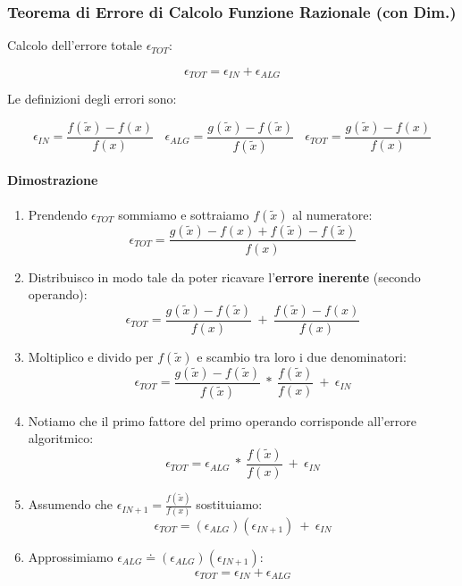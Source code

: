 \documentclass{article}
\begin{document}
\subsubsection{Teorema di Errore di Calcolo Funzione Razionale (con Dim.)}

Calcolo dell'errore totale $\epsilon_{TOT}$:

\[ \boxed{\epsilon_{TOT} = \epsilon_{IN} + \epsilon_{ALG}} \]

Le definizioni degli errori sono:

\[ \boxed{\epsilon_{IN} = \frac{f(\tilde{x}) - f(x)}{f(x)}} \:\:\:\: \boxed{\epsilon_{ALG} = \frac{g(\tilde{x}) - f(\tilde{x})}{f(\tilde{x})}} \:\:\:\: \boxed{\epsilon_{TOT} = \frac{g(\tilde{x}) - f(x)}{f(x)}}\]

\paragraph{Dimostrazione}

\begin{enumerate}
    \item Prendendo $\epsilon_{TOT}$ sommiamo e sottraiamo $f(\tilde{x})$ al numeratore:
    \[ \epsilon_{TOT} = \frac{g(\tilde{x})-f(x)+f(\tilde{x})-f(\tilde{x})}{f(x)} \]
    \item Distribuisco in modo tale da poter ricavare l'\textbf{errore inerente} (secondo operando):
    \[ \epsilon_{TOT} = \frac{g(\tilde{x})-f(\tilde{x})}{f(x)} \: + \: \frac{f(\tilde{x})-f(x)}{f(x)}  \]
    \item Moltiplico e divido per $f(\tilde{x})$ e scambio tra loro i due denominatori:
    \[ \epsilon_{TOT} = \frac{g(\tilde{x})-f(\tilde{x})}{f(\tilde{x})} \: * \: \frac{f(\tilde{x})}{f(x)}\:+\:\epsilon_{IN}  \]
    \item Notiamo che il primo fattore del primo operando corrisponde all'errore algoritmico:
    \[ \epsilon_{TOT} = \epsilon_{ALG} \: * \: \frac{f(\tilde{x})}{f(x)}\:+\:\epsilon_{IN}  \]
    \item Assumendo che $\epsilon_{IN+1} = \frac{f(\tilde{x})}{f(x)}$ sostituiamo:
    \[ \epsilon_{TOT} = (\epsilon_{ALG})(\epsilon_{IN+1})\:+\:\epsilon_{IN}  \]
    \item Approssimiamo $\epsilon_{ALG} \doteq (\epsilon_{ALG})(\epsilon_{IN+1})$:
    \[ \boxed{\epsilon_{TOT} = \epsilon_{IN} + \epsilon_{ALG}} \]
    
\end{enumerate}

\newpage
\end{document}
